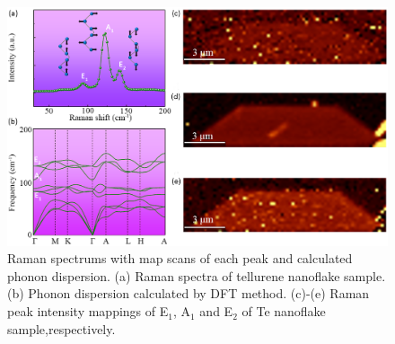 \documentclass[journal=jacsat,manuscript=article]{achemso}
\begin{document}
\begin{figure}
  \centering
  \includegraphics[width=\linewidth]{raman.png}
  \caption{Raman spectrums with map scans of each peak and calculated phonon dispersion. (a) Raman spectra of tellurene nanoflake sample. (b) Phonon dispersion calculated by DFT method. (c)-(e) Raman peak intensity mappings of E$_1$, A$_1$ and E$_2$ of Te nanoflake sample,respectively.}
    \label{fig:raman}
\end{figure}
\end{document}
